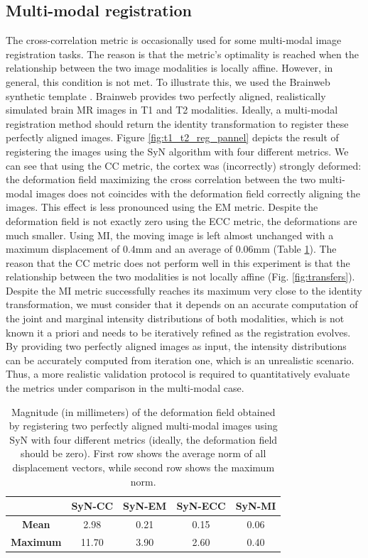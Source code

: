 \subsection{Multi-modal registration}\label{sec:multimodal_results}
The cross-correlation metric is occasionally used for some multi-modal image registration tasks. The reason is that the metric's optimality is reached when the relationship between the two image modalities is locally affine. However, in general, this condition is not met. To illustrate this, we used the Brainweb synthetic template \citep{Cocosco1997, Kwan1999}. Brainweb provides two perfectly aligned, realistically simulated brain MR images in T1 and T2 modalities. Ideally, a multi-modal registration method should return the identity transformation to register these perfectly aligned images. Figure \ref{fig:t1_t2_reg_pannel} depicts the result of registering the images using the SyN algorithm with four different metrics. We can see that using the CC metric, the cortex was (incorrectly) strongly deformed: the deformation field maximizing the cross correlation between the two multi-modal images does not coincides with the deformation field correctly aligning the images. This effect is less pronounced using the EM metric. Despite the deformation field is not exactly zero using the ECC metric, the deformations are much smaller. Using MI, the moving image is left almost unchanged with a maximum displacement of 0.4mm and an average of 0.06mm (Table \ref{tab:deformation_magnitude}). The reason that the CC metric does not perform well in this experiment is that the relationship between the two modalities is not locally affine (Fig. \ref{fig:transfers}). Despite the MI metric successfully reaches its maximum very close to the identity transformation, we must consider that it depends on an accurate computation of the joint and marginal intensity distributions of both modalities, which is not known {it a priori} and needs to be iteratively refined as the registration evolves. By providing two perfectly aligned images as input, the intensity distributions can be accurately computed from iteration one, which is an unrealistic scenario. Thus, a more realistic validation protocol is required to quantitatively evaluate the metrics under comparison in the multi-modal case.

\begin{table}[htbp]
  \centering
  {\small
    \begin{tabular}{ccccc}
    \toprule
    \textbf{} & \textbf{SyN-CC} & \textbf{SyN-EM} & \textbf{SyN-ECC} &\textbf{SyN-MI} \\
    \midrule
    \textbf{Mean}    & 2.98  & 0.21 & 0.15 & 0.06 \\
    \textbf{Maximum} & 11.70 & 3.90 & 2.60 & 0.40\\
    \bottomrule
    \end{tabular}%
    \caption{Magnitude (in millimeters) of the deformation field obtained by registering two perfectly aligned multi-modal images using SyN with four different metrics (ideally, the deformation field should be zero). First row shows the average norm of all displacement
    vectors, while second row shows the maximum norm.}
  \label{tab:deformation_magnitude}}%
\end{table}%


